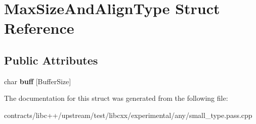 \hypertarget{struct_max_size_and_align_type}{}\section{Max\+Size\+And\+Align\+Type Struct Reference}
\label{struct_max_size_and_align_type}
\subsection*{Public Attributes}
\begin{DoxyCompactItemize}
\item 
\mbox{\label{struct_max_size_and_align_type_a83c8fa219c4ba1983d5d605e23117d1d}} 
char {\bfseries buff} \mbox{[}Buffer\+Size\mbox{]}
\end{DoxyCompactItemize}


The documentation for this struct was generated from the following file\+:\begin{DoxyCompactItemize}
\item 
contracts/libc++/upstream/test/libcxx/experimental/any/small\+\_\+type.\+pass.\+cpp\end{DoxyCompactItemize}
